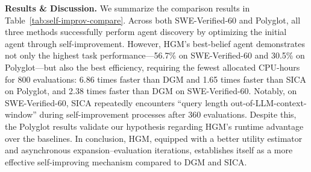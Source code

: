 \documentclass{article} %
\begin{document}
\begin{table}[t!]
  \centering
  \label{tab:self-improv-compare}
  \renewcommand\arraystretch{1.2} 
\end{table}

\textbf{Results \& Discussion.} We summarize the comparison results in Table~\ref{tab:self-improv-compare}. Across both SWE-Verified-60 and Polyglot, all three methods successfully perform agent discovery by optimizing the initial agent through self-improvement. However, HGM’s best-belief agent demonstrates not only the highest task performance---56.7\% on SWE-Verified-60 and 30.5\% on Polyglot---but also the best efficiency, requiring the fewest allocated CPU-hours for 800 evaluations: 6.86 times faster than DGM and 1.65 times faster than SICA on Polyglot, and 2.38 times faster than DGM on SWE-Verified-60. Notably, on SWE-Verified-60, SICA repeatedly encounters ``query length out-of-LLM-context-window'' during self-improvement processes after 360 evaluations. Despite this, the Polyglot results validate our hypothesis regarding HGM’s runtime advantage over the baselines. In conclusion, HGM, equipped with a better utility estimator and asynchronous expansion–evaluation iterations, establishes itself as a more effective self-improving mechanism compared to DGM and SICA.
\end{document}
